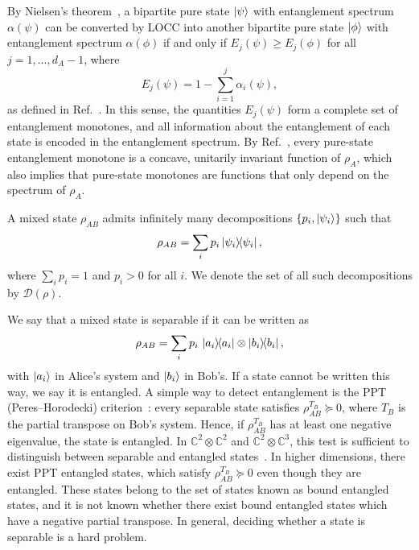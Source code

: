 \documentclass[11pt,a4paper]{report}
\renewcommand{\a}{\alpha}
\newcommand{\C}{\mathds{C}}
\begin{document}
By Nielsen's theorem~\cite{Nielsen1999MajLOCC}, a bipartite pure state $\ket{\psi}$ with entanglement spectrum $\a(\psi)$ can be converted by LOCC into another bipartite pure state $\ket{\phi}$ with entanglement spectrum $\a(\phi)$ if and only if $E_j(\psi)\geq E_j(\phi)$ for all $j=1,\dots,d_A-1$, where
\begin{equation}\label{eq:Vidal}
    E_j(\psi)=1-\sum_{i=1}^{j} \a_i(\psi),
\end{equation}
as defined in Ref.~\cite{Vidal_1999}. In this sense, the quantities $E_j(\psi)$ form a complete set of entanglement monotones, and all information about the entanglement of each state is encoded in the entanglement spectrum. By Ref.~\cite{Vidal_2000}, every pure-state entanglement monotone is a concave, unitarily invariant function of $\rho_A$, which also implies that pure-state monotones are functions that only depend on the spectrum of $\rho_A$.

A mixed state $\rho_{AB}$ admits infinitely many decompositions $\{p_i, \ket{\psi_i}\}$ such that
\begin{equation}
    \rho_{AB} = \sum_i p_i \dyad{\psi_i},
\end{equation}
where $\sum_i p_i = 1$ and $p_i > 0$ for all $i$. We denote the set of all such decompositions by $\mathcal{D}(\rho)$.

We say that a mixed state is separable if it can be written as
\begin{equation}
    \rho_{AB} = \sum_i p_i \,\dyad{a_i} \otimes \dyad{b_i},
\end{equation}
with $\ket{a_i}$ in Alice's system and $\ket{b_i}$ in Bob's. If a state cannot be written this way, we say it is entangled.
A simple way to detect entanglement is the PPT (Peres--Horodecki) criterion~\cite{Peres1996,Horodecki1996}: every separable state satisfies $\rho_{AB}^{T_B} \succeq 0$, where $T_B$ is the partial transpose on Bob's system. Hence, if $\rho_{AB}^{T_B}$ has at least one negative eigenvalue, the state is entangled.
In $\C^2 \otimes \C^2$ and $\C^2 \otimes \C^3$, this test is sufficient to distinguish between separable and entangled states~\cite{Horodecki1996}. In higher dimensions, there exist PPT entangled states, which satisfy $\rho_{AB}^{T_B}\succeq0$ even though they are entangled.
These states belong to the set of states known as bound entangled states, and it is not known whether there exist bound entangled states which have a negative partial transpose. In general, deciding whether a state is separable is a hard problem.
\end{document}
